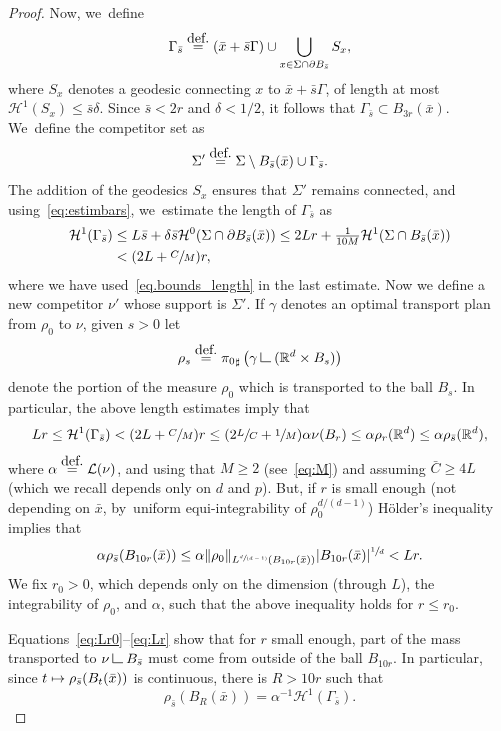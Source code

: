 \documentclass[11pt]{article}
\numberwithin{equation}{section}
\newcommand\mto{\mathchoice{\longmapsto}{\mapsto}{\mapsto}{\mapsto}}
\newcommand{\spfrac}[2]{\sfrac{#1}{(#2)}}
\theoremstyle{definition}
\newcommand{\eqdef}{\ensuremath{\stackrel{\mbox{\upshape\tiny def.}}{=}}}
\newcommand\LM[1]{\hbox{\vrule width.5pt \vbox to#1pt{\vfill \hrule width#1pt height.5pt}}}
\newcommand\LL{{\mathchoice {\>\LM7\>}{\>\LM7\>}{\,\LM5\,}{\,\LM{3.35}\,}}}
\newcommand{\mres}{\LL}
\newcommand\cH{\mathcal{H}}
\newcommand\cL{\mathcal{L}}
\newcommand{\RR}{\mathbb{R}}
\begin{document}
\begin{proof}
Now, we~define
\[
\Gamma_{\bar s} \eqdef (\bar x + \bar s \Gamma) \cup \bigcup_{x \in \Sigma \cap \partial B_{\bar s}} S_x,
\]
where $S_x$ denotes a geodesic connecting $x$ to $\bar x + \bar s \Gamma$, of
length at most $\cH^1(S_x)\le \bar s\delta$.
Since $\bar s<2r$ and $\delta<1/2$, it follows that $\Gamma_{\bar s} \subset B_{3r}(\bar x)$. We~define the competitor set as
\[
\Sigma' \eqdef \Sigma \setminus B_{\bar s}(\bar x) \cup \Gamma_{\bar s}.
\]
The addition of the geodesics $S_x$ ensures that $\Sigma'$ remains connected, and using~\eqref{eq:estimbars}, we~estimate the length of $\Gamma_{\bar s}$ as
\begin{equation}\label{eq:lengthGamma}
\begin{aligned}
\cH^1(\Gamma_{\bar s})
&\le L\bar s + \delta\bar s\cH^0(\Sigma\cap\partial B_{\bar s}(\bar x))
\le 2Lr + \tfrac{1}{10M}\cH^1(\Sigma\cap B_{\bar s}(\bar x))\\
&< (2L + \sfrac{C}{M})r,
\end{aligned}
\end{equation}
where we have used~\eqref{eq.bounds_length} in the last estimate.
Now we define a new competitor $\nu'$ whose support is $\Sigma'$. If $\gamma$ denotes an optimal transport plan from $\rho_0$ to $\nu$, given $s >0$ let
\[
\rho_{s} \eqdef {\pi_{0}}_\sharp\left(\gamma \mres(\RR^d\times B_{s})\right)
\]
denote the portion of the measure $\rho_0$ which is transported to the ball $B_{s}$. In particular, the above length estimates imply that
\begin{equation}\label{eq:Lr0}
Lr
\le
\cH^1(\Gamma_{\bar s})
<
(2L+\sfrac{C}{M})r
\le
(2\sfrac{L}{C}+\sfrac{1}{M})\alpha\nu(B_r)
\le
\alpha \rho_r(\RR^d)\leq \alpha \rho_{\bar s}(\RR^d),
\end{equation}
where $\alpha\eqdef\cL(\nu)$, and using that $M\ge 2$ (see~\eqref{eq:M}) and assuming $\bar C\ge 4L$ (which we recall depends
only on $d$ and $p$).
But, if $r$ is small enough (not depending on $\bar x$, by~uniform equi-integrability
of $\rho_0^{d/(d-1)}$) Hölder's inequality implies that
\begin{equation}\label{eq:Lr}
\alpha \rho_{\bar s}(B_{10r}(\bar x))
\le
\alpha\|\rho_0\|_{L^{\spfrac{d}{d-1}}(B_{10r}(\bar x))}
|B_{10r}(\bar x)|^{\sfrac{1}{d}} < Lr.
\end{equation}
We fix $r_0>0$, which depends only on the dimension (through $L$), the integrability of $\rho_0$, and $\alpha$, such that the above inequality holds for $r\le r_0$.

Equations~\eqref{eq:Lr0}--\eqref{eq:Lr} show that for $r$ small enough, part of the mass transported to $\nu \mres B_{\bar s}$ must come from outside of the ball $B_{10r}$. In particular, since $t \mto \rho_{\bar s}(B_t(\bar x))$ is continuous, there is $R > 10r$ such that
\begin{equation}\label{equation.mass_inNout_BR}
\rho_{\bar s}(B_R(\bar x)) = \alpha^{-1}\cH^1(\Gamma_{\bar s}).
\end{equation}


\end{proof}
\end{document}
